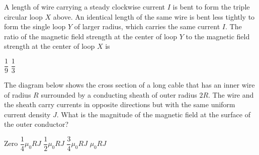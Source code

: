 \documentclass[12pt]{../../oss-classkick-exam}
\begin{document}
\begin{questions}

  \question A length of wire carrying a steady clockwise current $I$ is bent
  to form the triple circular loop $X$ above. An identical length of the same
  wire is bent less tightly to form the single loop $Y$ of larger radius, which
  carries the same current $I$. The ratio of the magnetic field strength at the
  center of loop $Y$ to the magnetic field strength at the center of loop $X$ is

  \begin{oneparchoices}
    \choice $\dfrac19$\hspace{.4in}
    \choice $\dfrac13$\hspace{.4in}
    \hspace{.4in}
    \hspace{.4in}
  \end{oneparchoices}

  \uplevel{\rule{\linewidth}{.5pt}}
  
  \question The diagram below shows the cross section of a long cable that has
  an inner wire of radius $R$ surrounded by a conducting sheath of outer radius
  $2R$. The wire and the sheath carry currents in opposite directions but with
  the same uniform current density $J$. What is the magnitude of the magnetic
  field at the surface of the outer conductor?
  
  \begin{minipage}{.35\linewidth}
  \end{minipage}
  \begin{minipage}{.4\linewidth}
    \begin{choices}
      \choice Zero
      \choice $\dfrac14\mu_0RJ$
      \choice $\dfrac12\mu_0RJ$
      \choice $\dfrac34\mu_0RJ$
      \choice $\mu_0RJ$
    \end{choices}
  \end{minipage}


\end{questions}
\end{document}
